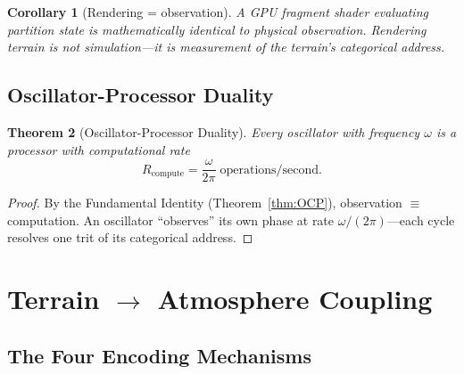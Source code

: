 \documentclass[10pt,twocolumn]{article}
\newtheorem{theorem}{Theorem}[section]
\newtheorem{corollary}[theorem]{Corollary}
\theoremstyle{definition}
\theoremstyle{remark}
\begin{document}
\begin{corollary}[Rendering = observation]
\label{cor:rendering}
A GPU fragment shader evaluating partition state is
mathematically identical to physical observation.  Rendering
terrain is not simulation---it is measurement of the terrain's
categorical address.
\end{corollary}

\subsection{Oscillator-Processor Duality}\label{sec:duality}

\begin{theorem}[Oscillator-Processor Duality]
\label{thm:osc_proc}
Every oscillator with frequency $\omega$ is a processor with
computational rate
\begin{equation}\label{eq:osc_proc}
  R_{\mathrm{compute}} = \frac{\omega}{2\pi}
  \;\text{operations/second.}
\end{equation}
\end{theorem}

\begin{proof}
By the Fundamental Identity (Theorem~\ref{thm:OCP}),
observation $\equiv$ computation.  An oscillator ``observes''
its own phase at rate $\omega/(2\pi)$---each cycle resolves
one trit of its categorical address.
\end{proof}

\section{Terrain $\to$ Atmosphere Coupling}
\label{sec:terrain_atmos}

\subsection{The Four Encoding Mechanisms}
\label{sec:four_mechanisms}
\end{document}
